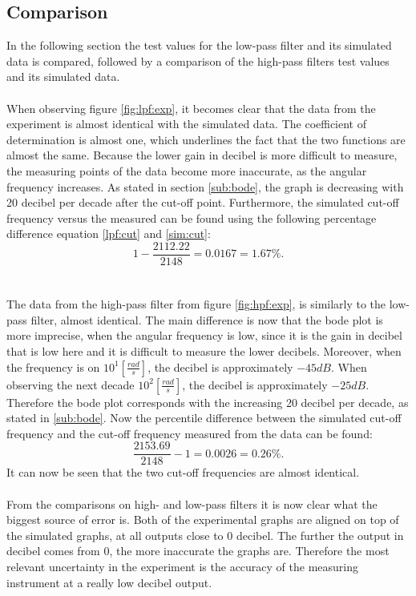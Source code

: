 \subsection{Comparison}
In the following section the test values for the low-pass filter and its simulated data is compared, followed by a comparison of the high-pass filters test values and its simulated data.
\\ \\
When observing figure \ref{fig:lpf:exp}, it becomes clear that the data from the experiment is almost identical with the simulated data. The coefficient of determination is almost one, which underlines the fact that the two functions are almost the same. Because the lower gain in decibel is more difficult to measure, the measuring points of the data become more inaccurate, as the angular frequency increases. As stated in section \ref{sub:bode}, the graph is decreasing with 20 decibel per decade after the cut-off point. Furthermore, the simulated cut-off frequency versus the measured can be found using the following percentage difference equation \eqref{lpf:cut} and \eqref{sim:cut}: $$1-\dfrac{2112.22}{2148}= 0.0167 = 1.67 \%.$$
\\ \\
The data from the high-pass filter from figure \ref{fig:hpf:exp}, is similarly to the low-pass filter, almost identical. The main difference is now that the bode plot is more imprecise, when the angular frequency is low, since it is the gain in decibel that is low here and it is difficult to measure the lower decibels. Moreover, when the frequency is on $10^{1} \left[\frac{rad}{s} \right]$, the decibel is approximately $-45 dB$. When observing the next decade $10^{2} \left[\frac{rad}{s} \right]$, the decibel is approximately $-25 dB$. Therefore the bode plot corresponds with the increasing 20 decibel per decade, as stated in \ref{sub:bode}. Now the percentile difference between the simulated cut-off frequency  and the cut-off frequency measured from the data can be found: 
$$\dfrac{2153.69}{2148}-1= 0.0026 = 0.26 \%.$$
It can now be seen that the two cut-off frequencies are almost identical.
\\ \\
From the comparisons on high- and low-pass filters it is now clear what the biggest source of error is. Both of the experimental graphs are aligned on top of the simulated graphs, at all outputs close to 0 decibel. The further the output in decibel comes from 0, the more inaccurate the graphs are. Therefore the most relevant uncertainty in the experiment is the accuracy of the measuring instrument at a really low decibel output.